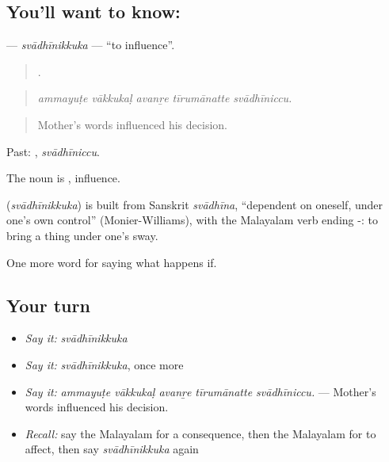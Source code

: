 \subsection*{You'll want to know: }
\textbf{} — \emph{svādhīnikkuka} — \textquotedblleft{}to influence\textquotedblright{}.

\begin{quote}
    .
\end{quote}

\begin{quote}
\emph{ammayuṭe vākkukaḷ avanṟe tīrumānatte svādhīniccu.}
\end{quote}

\begin{quote}
Mother's words influenced his decision.
\end{quote}

Past: , \emph{svādhīniccu}.

The noun is , influence.

\begin{cousinweb}
\textbf{} (\emph{svādhīnikkuka}) is built from Sanskrit \emph{svādhīna}, \textquotedblleft{}dependent on oneself, under one's own control\textquotedblright{} (Monier-Williams), with the Malayalam verb ending -: to bring a thing under one's sway.
\end{cousinweb}

\begin{grammarlens}[title={What you've built}]
One more word for saying what happens if.
\end{grammarlens}

\subsection*{Your turn}
\begin{itemize}
\raggedright
  \item \emph{Say it:} \emph{svādhīnikkuka}
  \item \emph{Say it:} \emph{svādhīnikkuka}, once more
  \item \emph{Say it:} \emph{ammayuṭe vākkukaḷ avanṟe tīrumānatte svādhīniccu.} — Mother's words influenced his decision.
  \item \emph{Recall:} say the Malayalam for a consequence, then the Malayalam for to affect, then say \emph{svādhīnikkuka} again
\end{itemize}

